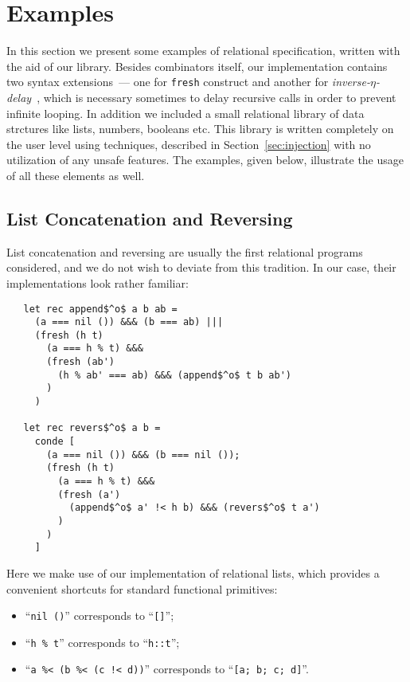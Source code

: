 \section{Examples}
\label{examples}

In this section we present some examples of relational specification, written with the aid of our library. 
Besides \miniKanren combinators itself, our implementation contains two syntax extensions~--- one
for \lstinline{fresh} construct and another for \emph{inverse-$\eta$-delay}~\cite{MicroKanren}, which is 
necessary sometimes to delay recursive calls in order to prevent infinite looping. In addition we included a 
small relational library of data strctures like lists, numbers, booleans etc. This library is written 
completely on the user level using techniques, described in Section~\ref{sec:injection} with no utilization 
of any unsafe features. The examples, given below, illustrate the usage of all these elements as well.

\subsection{List Concatenation and Reversing}

List concatenation and reversing are usually the first relational programs considered, and we do not wish
to deviate from this tradition. In our case, their implementations look rather familiar:

\begin{lstlisting}
   let rec append$^o$ a b ab =
     (a === nil ()) &&& (b === ab) |||
     (fresh (h t)
       (a === h % t) &&&
       (fresh (ab')
         (h % ab' === ab) &&& (append$^o$ t b ab') 
       )
     )

   let rec revers$^o$ a b =
     conde [
       (a === nil ()) &&& (b === nil ());
       (fresh (h t)
         (a === h % t) &&&
         (fresh (a')
           (append$^o$ a' !< h b) &&& (revers$^o$ t a')
         )
       )
     ]
\end{lstlisting}

Here we make use of our implementation of relational lists, which provides a convenient shortcuts for
standard functional primitives:

\begin{itemize}
  \item ``\lstinline{nil ()}'' corresponds to ``\lstinline{[]}'';
  \item ``\lstinline{h % t}'' corresponds to ``\lstinline{h::t}'';
  \item ``\lstinline{a %< (b %< (c !< d))}'' corresponds to ``\lstinline{[a; b; c; d]}''.
\end{itemize}

